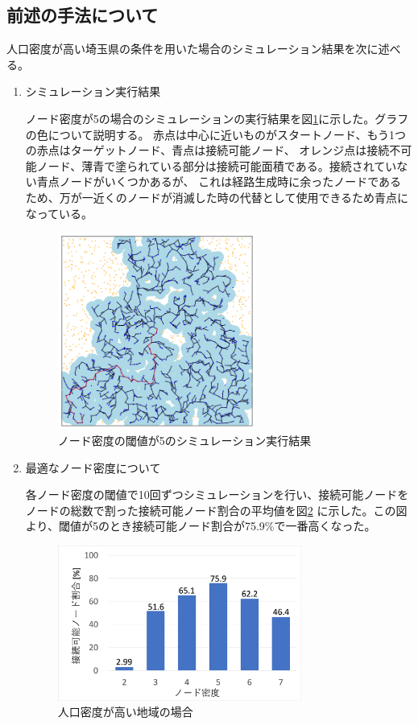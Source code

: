\documentclass[a4paper, 9pt]{ltjsarticle}
\begin{document}
\subsection{前述の手法について} \label{sublabel:high population density methods}
人口密度が高い埼玉県の条件を用いた場合のシミュレーション結果を次に述べる。 \par
\begin{enumerate}
  \item シミュレーション実行結果 \par
  \indent ノード密度が5の場合のシミュレーションの実行結果を図\ref{fig:1}に示した。グラフの色について説明する。
  赤点は中心に近いものがスタートノード、もう1つの赤点はターゲットノード、青点は接続可能ノード、
  オレンジ点は接続不可能ノード、薄青で塗られている部分は接続可能面積である。接続されていない青点ノードがいくつかあるが、
  これは経路生成時に余ったノードであるため、万が一近くのノードが消滅した時の代替として使用できるため青点になっている。
  \begin{figure}[ht]
    \centering
    \includegraphics[width=65mm]{シミュレーションの様子.png}
    \caption{ノード密度の閾値が5のシミュレーション実行結果}
    \label{fig:1}
  \end{figure}

  \item 最適なノード密度について \par
  \indent 各ノード密度の閾値で10回ずつシミュレーションを行い、接続可能ノードをノードの総数で割った接続可能ノード割合の平均値を図\ref{fig:2}
  に示した。この図より、閾値が5のとき接続可能ノード割合が75.9\%で一番高くなった。 \par
  \begin{figure}[ht] %
    \centering
    \includegraphics[width=80mm]{提案1の結果.png}
    \caption{人口密度が高い地域の場合}
    \label{fig:2} %
  \end{figure}


\end{enumerate}
\end{document}
